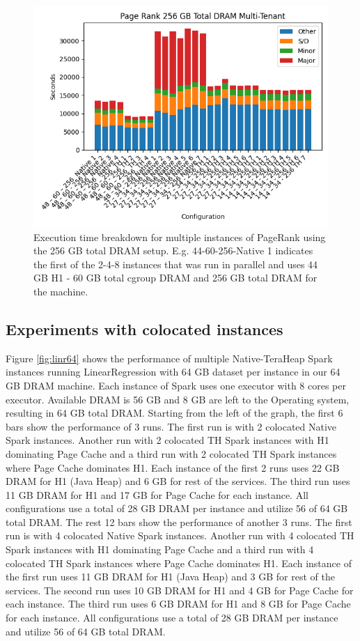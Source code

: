 \begin{figure}[ht!]
    \includegraphics[width=\linewidth]{./fig/pr256.png}
    \caption{Execution time breakdown for multiple instances of
    PageRank using the 256 GB total DRAM setup. E.g. 44-60-256-Native
    1 indicates the first of the 2-4-8 instances that was run in
    parallel and uses 44 GB H1 - 60 GB total cgroup DRAM and 256 GB
    total DRAM for the machine.} 
    \label{fig:pr256}
\end{figure}


\subsection{Experiments with colocated instances}

Figure \ref{fig:linr64} shows the performance of multiple
Native-TeraHeap Spark instances running LinearRegression with 64 GB
dataset per instance in our 64 GB DRAM machine. Each instance of Spark
uses one executor with 8 cores per executor. Available DRAM is 56 GB
and 8 GB are left to the Operating system, resulting in 64 GB total
DRAM. 
Starting from the left of the graph, the first 6 bars show the
performance of 3 runs. The first run is with 2 colocated Native Spark instances.
Another run with 2 colocated TH Spark instances with H1 dominating Page Cache
and a third run with 2 colocated TH Spark instances where Page Cache dominates H1. 
Each instance of the first 2 runs uses 22 GB DRAM for H1 (Java Heap) and 6 GB for rest of the services.
The third run uses 11 GB DRAM for H1 and 17 GB for Page Cache for each instance. All configurations use
a total of 28 GB DRAM per instance and utilize 56 of 64 GB total DRAM. 
The rest 12 bars show the
performance of another 3 runs. The first run is with 4 colocated Native Spark instances.
Another run with 4 colocated TH Spark instances with H1 dominating Page Cache
and a third run with 4 colocated TH Spark instances where Page Cache dominates H1. 
Each instance of the first run uses 11 GB DRAM for H1 (Java Heap) and 3 GB for rest of the services. 
The second run uses 10 GB DRAM for H1 and 4 GB for Page Cache for each instance. 
The third run uses 6 GB DRAM for H1 and 8 GB for Page Cache for each instance. 
All configurations use a total of 28 GB DRAM per instance and utilize 56 of 64 GB total DRAM.

